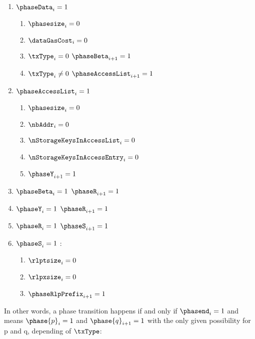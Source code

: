 \begin{enumerate}[resume]
\begin{enumerate}
            \item \If $\phaseData_{i} = 1$ \Then 
                \begin{enumerate}
                    \item \trash $\phasesize_{i} = 0$
                    \item $\dataGasCost_{i} = 0$
                    \item \If $\txType_{i} = 0$ \Then $\phaseBeta_{i + 1} = 1$
                    \item \If $\txType_{i} \neq 0$ \Then $\phaseAccessList_{i + 1} = 1$
                \end{enumerate}
            \item \If $\phaseAccessList_{i} = 1$ \Then 
                \begin{enumerate}
                    \item \trash $\phasesize_{i} = 0$
                    \item $\nbAddr_{i} = 0$
                    \item $\nStorageKeysInAccessList_{i} = 0$
                    \item $\nStorageKeysInAccessEntry_{i} = 0$
                    \item $\phaseY_{i + 1} = 1$
                \end{enumerate}
            \item \If $\phaseBeta_{i} = 1$ \Then $\phaseR_{i + 1} = 1$
            \item \If $\phaseY_{i} = 1$ \Then $\phaseR_{i + 1} = 1$
            \item \If $\phaseR_{i} = 1$ \Then $\phaseS_{i + 1} = 1$
            \item \If $\phaseS_{i} = 1$ \Then:
                \begin{enumerate}
                    \item $\rlptsize_{i} = 0$
                    \item $\rlpxsize_{i} = 0$
                    \item $\phaseRlpPrefix_{i + 1} = 1$
                \end{enumerate}
        \end{enumerate}
\end{enumerate}

In other words, a phase transition happens if and only if $\phasend_{i} = 1$ and means $\phase{p}_{i} = 1$ and $\phase{q}_{i + 1} = 1$ with the only given possibility for p and q, depending of $\txType$: 


